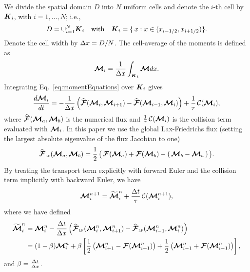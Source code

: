 We divide the spatial domain $D$ into $N$ uniform cells and denote the $i$-th cell by $\boldsymbol{K}_{i}$, with $i = 1,\ldots,N$; i.e.,
\begin{equation*}
  D = \cup_{i = 1}^{N} \boldsymbol{K}_{i} \quad \text{with} \quad
  \boldsymbol{K}_{i}=\{\,x : x\in(x_{i-1/2}, x_{i+1/2})\}.
\end{equation*}
Denote the cell width by $\Delta x = D/N$.  
The cell-average of the moments is defined as
\begin{equation}
  \boldsymbol{\mathcal{M}}_{i} = \dfrac{1}{\Delta x} \int_{\boldsymbol{K}_i}\boldsymbol{\mathcal{M}} dx.
\end{equation}
Integrating Eq.~\eqref{eq:momentEquations} over $\boldsymbol{K}_{i}$ gives
\begin{equation}
  \dfrac{d \bcM_{i}}{d t} = - \dfrac{1}{\dx} \left( \widehat{\bcF}(\bcM_{i},\bcM_{i+1}) -  \widehat{\bcF}(\bcM_{i-1},\bcM_{i})\right) + \f{1}{\tau}\,\cC(\bcM_{i}),
  \label{eq:SemiDiscretizatedMomentEquation}
\end{equation}
where $\widehat{\boldsymbol{\mathcal{F}}}(\boldsymbol{\mathcal{M}}_{a},\boldsymbol{\mathcal{M}}_{b})$ is the numerical flux and $\frac{1}{\tau}\,\mathcal{C}(\boldsymbol{\mathcal{M}}_{i})$ is the collision term evaluated with $\boldsymbol{\mathcal{M}}_{i}$.
In this paper we use the global Lax-Friedrichs flux (setting the largest absolute eigenvalue of the flux Jacobian to one)
\begin{equation}
  \widehat{\bcF}_{\LF}(\vect{\cM}_{a},\vect{\cM}_{b})
  =\f{1}{2}\,\big(\,\bcF(\vect{\cM}_{a})+\bcF(\vect{\cM}_{b})-(\,\vect{\cM}_{b}-\vect{\cM}_{a}\,)\,\big).
  \label{eq:Lax-Friedrichs flux}
\end{equation}
By treating the transport term explicitly with forward Euler and the collision term implicitly with backward Euler, we have
\begin{align}
  \bcM_{i}^{n+1} = \widetilde{\bcM}^{n}_{i} + \f{\dt}{\tau}\,\cC(\bcM^{n+1}_{i}),
  \label{eq:MomentIMEX}
\end{align}
where we have defined
\begin{align}
  \widetilde{\bcM}^{n}_{i} 
  & = \bcM_{i}^{n} - \frac{\dt}{\dx} \left( \widehat{\bcF}_{\LF}(\bcM^{n}_{i},\bcM^{n}_{i+1}) -  \widehat{\bcF}_{\LF}(\bcM^{n}_{i-1},\bcM^{n}_{i})\right)\nonumber \\
  & = (1-\beta)\bcM_{i}^{n} + \beta\left[ \f{1}{2}\left( \bcM^{n}_{i+1}-\bcF(\bcM^{n}_{i+1})\right)  + \f{1}{2}\left( \bcM^{n}_{i-1}+\bcF(\bcM^{n}_{i-1})\right)\right],
\label{eq:widetildeM}
\end{align}
and $\beta = \frac{\Delta t}{\Delta x}$.


